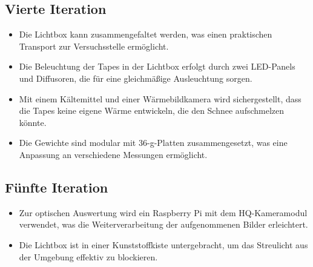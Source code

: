 \subsection{Vierte Iteration}

\begin{itemize}
    \item Die Lichtbox kann zusammengefaltet werden, was einen praktischen Transport zur Versuchsstelle ermöglicht.
    \item Die Beleuchtung der Tapes in der Lichtbox erfolgt durch zwei LED-Panels und Diffusoren, die für eine gleichmäßige Ausleuchtung sorgen.
    \item Mit einem Kältemittel und einer Wärmebildkamera wird sichergestellt, dass die Tapes keine eigene Wärme entwickeln, die den Schnee aufschmelzen könnte.
    \item Die Gewichte sind modular mit 36-g-Platten zusammengesetzt, was eine Anpassung an verschiedene Messungen ermöglicht.
\end{itemize}

\subsection{Fünfte Iteration}

\begin{itemize}
    \item Zur optischen Auswertung wird ein Raspberry Pi mit dem HQ-Kameramodul verwendet, was die Weiterverarbeitung der aufgenommenen Bilder erleichtert.
    \item Die Lichtbox ist in einer Kunststoffkiste untergebracht, um das Streulicht aus der Umgebung effektiv zu blockieren.
\end{itemize}
